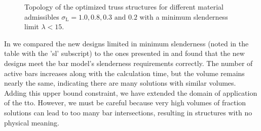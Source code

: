 \begin{figure}
    \hfill
    \hfill
    \hfill
    \caption{Topology of the optimized truss structures for different material admissibles $\sigma_\text{L}=1.0,0.8,0.3\text{ and }0.2$ with a minimum slenderness limit $\lambda<15$.}
    \label{fig:04_tto_slend}
\end{figure}

In  we compared the new designs limited in minimum slenderness (noted in the table with the 'sl' subscript) to the ones presented in  and found that the new designs meet the bar model's slenderness requirements correctly. The number of active bars increases along with the calculation time, but the volume remains nearly the same, indicating there are many solutions with similar volumes. Adding this upper bound constraint, we have extended the domain of application of the \gls{tto}. However, we must be careful because very high volumes of fraction solutions can lead to too many bar intersections, resulting in structures with no physical meaning.

